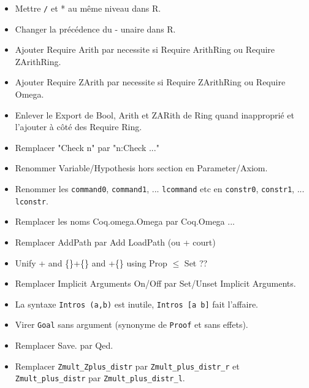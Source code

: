 \documentclass{article}
\begin{document}
\begin{itemize}

\item Mettre \verb=/= et * au même niveau dans R.

\item Changer la précédence du - unaire dans R.

\item Ajouter Require Arith par necessite si Require ArithRing ou Require ZArithRing.

\item Ajouter Require ZArith par necessite si Require ZArithRing ou Require Omega.

\item Enlever le Export de Bool, Arith et ZARith de Ring quand inapproprié et
l'ajouter à côté des Require Ring.

\item Remplacer "Check n" par "n:Check ..."

\item Renommer Variable/Hypothesis hors section en Parameter/Axiom.

\item Renommer les \verb=command0=, \verb=command1=, ... \verb=lcommand= etc en
\verb=constr0=, \verb=constr1=, ... \verb=lconstr=.

\item Remplacer les noms Coq.omega.Omega par Coq.Omega ...

\item Remplacer AddPath par Add LoadPath (ou + court)

\item Unify + and \{\}+\{\} and +\{\} using Prop $\leq$ Set ??

\item Remplacer Implicit Arguments On/Off par Set/Unset Implicit Arguments.

\item La syntaxe \verb=Intros (a,b)= est inutile, \verb=Intros [a b]= fait l'affaire.

\item Virer \verb=Goal= sans argument (synonyme de \verb=Proof= et sans effets).

\item Remplacer Save. par Qed.

\item Remplacer \verb=Zmult_Zplus_distr= par \verb=Zmult_plus_distr_r=
et \verb=Zmult_plus_distr= par \verb=Zmult_plus_distr_l=.

\end{itemize}
\end{document}
